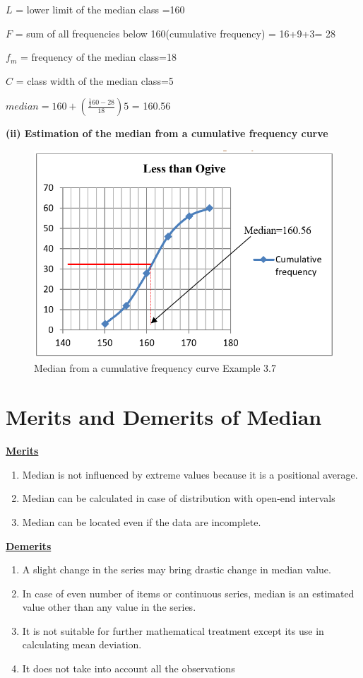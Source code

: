\documentclass[
]{book}
\begin{document}
\(L\) = lower limit of the median class =160

\(F\) = sum of all frequencies below 160(cumulative frequency) = 16+9+3=
28

\(f_{m}\) = frequency of the median class=18

\(C\) = class width of the median class=5

\(median = 160 + \left( \frac{\frac{1}{2}60 - 28}{18} \right)5\) = 160.56

\textbf{(ii) Estimation of the median from a cumulative frequency curve}

\begin{figure}

{\centering \includegraphics[width=0.4\linewidth]{images/cf} 

}

\caption{Median from a cumulative frequency curve Example 3.7}\label{fig:mediancf1}
\end{figure}

\hypertarget{merits-and-demerits-of-median}{%
\section{Merits and Demerits of Median}\label{merits-and-demerits-of-median}}

\underline{\textbf{Merits}}

\begin{enumerate}
\def\labelenumi{\arabic{enumi}.}
\item
  Median is not influenced by extreme values because it is a
  positional average.
\item
  Median can be calculated in case of distribution with open-end
  intervals
\item
  Median can be located even if the data are incomplete.
\end{enumerate}

\underline{\textbf{Demerits}}

\begin{enumerate}
\def\labelenumi{\arabic{enumi}.}
\item
  A slight change in the series may bring drastic change in median
  value.
\item
  In case of even number of items or continuous series, median is an
  estimated value other than any value in the series.
\item
  It is not suitable for further mathematical treatment except its use
  in calculating mean deviation.
\item
  It does not take into account all the observations
\end{enumerate}
\end{document}
